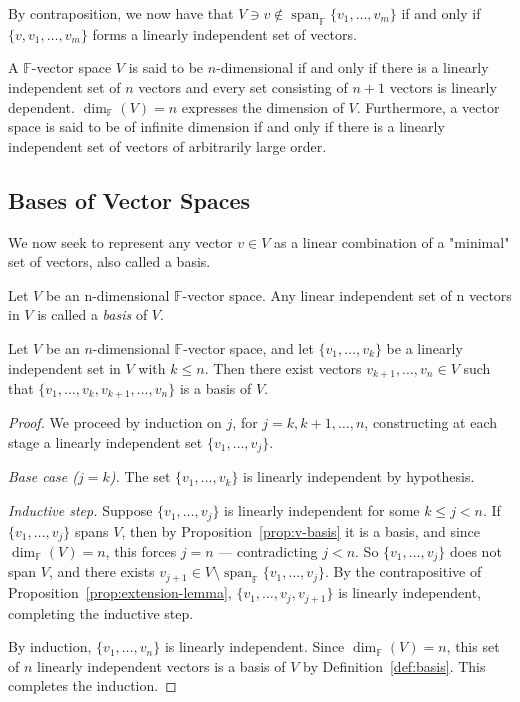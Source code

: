 		\noindent By contraposition, we now have that $V \ni v \notin \operatorname{span}_{\mathbb{F}}\{v_1, \dots, v_m\}$ if and only if $\{v, v_1, \dots, v_m\}$ forms a linearly independent set of vectors.
		
		\begin{definition}[Dimension]
			\label{def:dimension}
			A $\mathbb{F}$-vector space $V$ is said to be $n$-dimensional if and only if there is a linearly independent set of $n$ vectors and every set consisting of $n+1$ vectors is linearly dependent. $\dim_{\mathbb{F}}(V) = n$ expresses the dimension of $V$. Furthermore, a vector space is said to be of infinite dimension if and only if there is a linearly independent set of vectors of arbitrarily large order.
		\end{definition}
		
	\subsection{Bases of Vector Spaces}
		
		\indent \indent We now seek to represent any vector $v \in V$ as a linear combination of a "minimal" set of vectors, also called a basis.
		
		\begin{definition}[Basis]
			\label{def:basis}
			Let $V$ be an n-dimensional $\mathbb{F}$-vector space. Any linear independent set of n vectors in $V$ is called a \textit{basis} of $V$.
		\end{definition}
		
		\begin{corollary}
			\label{cor:basis-extension}
			Let $V$ be an $n$-dimensional $\mathbb{F}$-vector space, and let $\{v_1,\dots,v_k\}$ be a linearly independent set in $V$ with $k \le n$. Then there exist vectors $v_{k+1},\dots,v_n \in V$ such that $\{v_1,\dots,v_k,v_{k+1},\dots,v_n\}$ is a basis of $V$.
		\end{corollary}
		
		\begin{proof}
			We proceed by induction on $j$, for $j=k,k+1,\dots,n$, constructing at each stage a linearly independent set $\{v_1,\dots,v_j\}$.
			
			\textit{Base case ($j=k$).} The set $\{v_1,\dots,v_k\}$ is linearly independent by hypothesis.
			
			\textit{Inductive step.} Suppose $\{v_1,\dots,v_j\}$ is linearly independent for some $k \le j < n$. If $\{v_1,\dots,v_j\}$ spans $V$, then by Proposition~\ref{prop:v-basis} it is a basis, and since $\dim_{\mathbb{F}}(V)=n$, this forces $j=n$ — contradicting $j<n$. So $\{v_1,\dots,v_j\}$ does not span $V$, and there exists $v_{j+1} \in V \setminus \operatorname{span}_{\mathbb{F}}\{v_1,\dots,v_j\}$. By the contrapositive of Proposition~\ref{prop:extension-lemma}, $\{v_1,\dots,v_j,v_{j+1}\}$ is linearly independent, completing the inductive step.
			
			By induction, $\{v_1,\dots,v_n\}$ is linearly independent. Since $\dim_{\mathbb{F}}(V)=n$, this set of $n$ linearly independent vectors is a basis of $V$ by Definition~\ref{def:basis}. This completes the induction.
		\end{proof}
		
